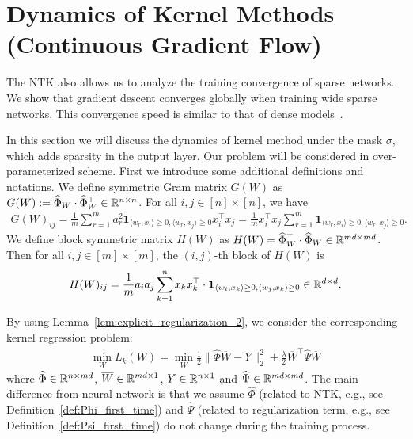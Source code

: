 \newpage
\section{Dynamics of Kernel Methods (Continuous Gradient Flow)}\label{sec:gradient_flow}

The NTK also allows us to analyze the training convergence of sparse networks.
We show that gradient descent converges globally when training wide sparse networks.
This convergence speed is similar to that of dense models~\citep{dzps19,als19_dnn}.

In this section we will discuss the dynamics of kernel method under the mask $\sigma$, which adds sparsity in the output layer. Our problem will be considered in over-parameterized scheme.
First we introduce some additional definitions and notations. We define symmetric Gram matrix $G(W)$ as $G(W) := \widehat{\Phi}_W\cdot\widehat{\Phi}_W^\top \in \mathbb{R}^{n\times n}$. For all $i, j\in [n] \times [n]$, we have
\begin{align*}
    G(W)_{ij} = \frac{1}{m}\sum_{r=1}^m a_r^2 \mathbf{1}_{\langle w_r, x_i \rangle\geq 0, \langle w_r, x_j \rangle\geq 0} x_i^\top x_j = \frac{1}{m} x_i^\top x_j \sum_{r=1}^m \mathbf{1}_{\langle w_r, x_i \rangle\geq 0, \langle w_r, x_j \rangle\geq 0}.
\end{align*}
We define block symmetric matrix $H(W)$ as $H(W) = \widehat{\Phi}_W^\top \cdot \widehat{\Phi}_W\in\mathbb{R}^{md\times md}$. Then for all $i, j\in [m] \times [m]$, the $(i,j)$-th block of $H(W)$ is
\begin{align*}
    H(W)_{ij} = \frac{1}{m} a_i a_j \sum_{k=1}^n x_k x_k^\top \cdot \mathbf{1}_{\langle w_i, x_k \rangle\geq 0, \langle w_j, x_k \rangle\geq 0} \in \mathbb{R}^{d\times d}.
\end{align*}


By using Lemma~\ref{lem:explicit_regularization_2}, we consider the corresponding kernel regression problem: 
\begin{align}
\label{eq:sc1}
    \min_{W}L_{k}(W) = \min_{W}\frac{1}{2}\|\hat{\Phi} \overline{W} - Y\|_2^2 + \frac{\lambda}{2}\overline{W}^{\top}\hat{\Psi} \overline{W}
\end{align}
where $\widehat{\Phi} \in \mathbb{R}^{n \times md}$, $\overline{W}\in \mathbb{R}^{md\times 1}$, $Y\in \mathbb{R}^{n\times 1}$ and $\widehat{\Psi}\in \mathbb{R}^{md\times md}$. The main difference from neural network is that we assume $\hat{\Phi}$ (related to NTK, e.g., see Definition~\ref{def:Phi_first_time}) and $\hat{\Psi}$ (related to regularization term, e.g., see Definition~\ref{def:Psi_first_time}) do not change during the training process. 






